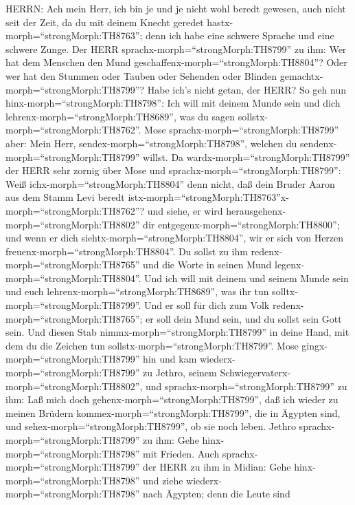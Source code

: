 HERRN: Ach mein Herr, ich bin je und je nicht wohl beredt gewesen, auch
nicht seit der Zeit, da du mit deinem Knecht geredet
hastx-morph=``strongMorph:TH8763''; denn ich habe eine schwere Sprache
und eine schwere Zunge.  Der HERR
sprachx-morph=``strongMorph:TH8799'' zu ihm: Wer hat dem Menschen den
Mund geschaffenx-morph=``strongMorph:TH8804''? Oder wer hat den Stummen
oder Tauben oder Sehenden oder Blinden
gemachtx-morph=``strongMorph:TH8799''? Habe ich's nicht getan, der HERR?
 So geh nun hinx-morph=``strongMorph:TH8798'': Ich will mit
deinem Munde sein und dich lehrenx-morph=``strongMorph:TH8689'', was du
sagen sollstx-morph=``strongMorph:TH8762''.  Mose
sprachx-morph=``strongMorph:TH8799'' aber: Mein Herr,
sendex-morph=``strongMorph:TH8798'', welchen du
sendenx-morph=``strongMorph:TH8799'' willst.  Da
wardx-morph=``strongMorph:TH8799'' der HERR sehr zornig über Mose und
sprachx-morph=``strongMorph:TH8799'': Weiß
ichx-morph=``strongMorph:TH8804'' denn nicht, daß dein Bruder Aaron aus
dem Stamm Levi beredt
istx-morph=``strongMorph:TH8763''x-morph=``strongMorph:TH8762''? und
siehe, er wird herausgehenx-morph=``strongMorph:TH8802'' dir
entgegenx-morph=``strongMorph:TH8800''; und wenn er dich
siehtx-morph=``strongMorph:TH8804'', wir er sich von Herzen
freuenx-morph=``strongMorph:TH8804''.  Du sollst zu ihm
redenx-morph=``strongMorph:TH8765'' und die Worte in seinen Mund
legenx-morph=``strongMorph:TH8804''. Und ich will mit deinem und seinem
Munde sein und euch lehrenx-morph=``strongMorph:TH8689'', was ihr tun
solltx-morph=``strongMorph:TH8799''.  Und er soll für dich
zum Volk redenx-morph=``strongMorph:TH8765''; er soll dein Mund sein,
und du sollst sein Gott sein.  Und diesen Stab
nimmx-morph=``strongMorph:TH8799'' in deine Hand, mit dem du die Zeichen
tun sollstx-morph=``strongMorph:TH8799''.  Mose
gingx-morph=``strongMorph:TH8799'' hin und kam
wiederx-morph=``strongMorph:TH8799'' zu Jethro, seinem
Schwiegervaterx-morph=``strongMorph:TH8802'', und
sprachx-morph=``strongMorph:TH8799'' zu ihm: Laß mich doch
gehenx-morph=``strongMorph:TH8799'', daß ich wieder zu meinen Brüdern
kommex-morph=``strongMorph:TH8799'', die in Ägypten sind, und
sehex-morph=``strongMorph:TH8799'', ob sie noch leben. Jethro
sprachx-morph=``strongMorph:TH8799'' zu ihm: Gehe
hinx-morph=``strongMorph:TH8798'' mit Frieden.  Auch
sprachx-morph=``strongMorph:TH8799'' der HERR zu ihm in Midian: Gehe
hinx-morph=``strongMorph:TH8798'' und ziehe
wiederx-morph=``strongMorph:TH8798'' nach Ägypten; denn die Leute sind
